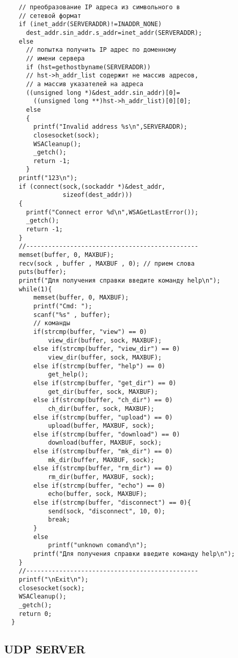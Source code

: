 \documentclass[12pt,a4paper]{report}
\begin{document}
\begin{lstlisting}
    // преобразование IP адреса из символьного в
    // сетевой формат
    if (inet_addr(SERVERADDR)!=INADDR_NONE)
      dest_addr.sin_addr.s_addr=inet_addr(SERVERADDR);
    else
      // попытка получить IP адрес по доменному
      // имени сервера
      if (hst=gethostbyname(SERVERADDR))
      // hst->h_addr_list содержит не массив адресов,
      // а массив указателей на адреса
      ((unsigned long *)&dest_addr.sin_addr)[0]=
        ((unsigned long **)hst->h_addr_list)[0][0];
      else 
      {
        printf("Invalid address %s\n",SERVERADDR);
        closesocket(sock);
        WSACleanup();
		_getch();
        return -1;
      }
	printf("123\n");
    if (connect(sock,(sockaddr *)&dest_addr,
                sizeof(dest_addr)))
    {
      printf("Connect error %d\n",WSAGetLastError());
	  _getch();
      return -1;
    }
	//-----------------------------------------------
	memset(buffer, 0, MAXBUF);
    recv(sock , buffer , MAXBUF , 0); // прием слова
    puts(buffer);
    printf("Для получения справки введите команду help\n");
    while(1){
		memset(buffer, 0, MAXBUF);
        printf("Cmd: ");
        scanf("%s" , buffer);
        // команды
        if(strcmp(buffer, "view") == 0)
			view_dir(buffer, sock, MAXBUF);
        else if(strcmp(buffer, "view_dir") == 0)
            view_dir(buffer, sock, MAXBUF);
        else if(strcmp(buffer, "help") == 0)
            get_help();
        else if(strcmp(buffer, "get_dir") == 0)
            get_dir(buffer, sock, MAXBUF);
        else if(strcmp(buffer, "ch_dir") == 0)
            ch_dir(buffer, sock, MAXBUF);
        else if(strcmp(buffer, "upload") == 0)
            upload(buffer, MAXBUF, sock);
		else if(strcmp(buffer, "download") == 0)
            download(buffer, MAXBUF, sock);
        else if(strcmp(buffer, "mk_dir") == 0)
            mk_dir(buffer, MAXBUF, sock);
        else if(strcmp(buffer, "rm_dir") == 0)
            rm_dir(buffer, MAXBUF, sock);
		else if(strcmp(buffer, "echo") == 0)
            echo(buffer, sock, MAXBUF);
		else if(strcmp(buffer, "disconnect") == 0){
            send(sock, "disconnect", 10, 0);
			break;
		}
        else
            printf("unknown comand\n");
        printf("Для получения справки введите команду help\n");
    }
	//-----------------------------------------------
	printf("\nExit\n");
    closesocket(sock);
    WSACleanup();
	_getch();
    return 0;
  }
\end{lstlisting}
\subsection*{UDP SERVER}
\end{document}
